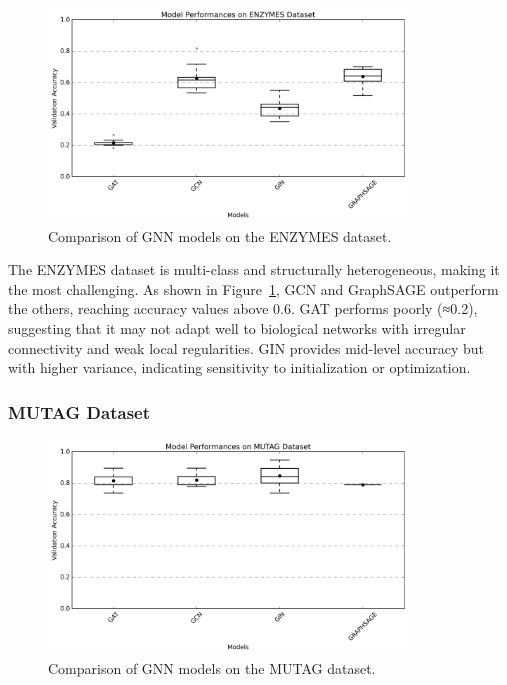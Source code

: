 \documentclass[11pt,a4paper]{article}
\begin{document}
	\begin{figure}[h]
		\centering
		\includegraphics[width=0.85\textwidth]{boxplot_ENZYMES.png}
		\caption{Comparison of GNN models on the ENZYMES dataset.}
		\label{fig:enzymes_models}
	\end{figure}
	
	The ENZYMES dataset is multi-class and structurally heterogeneous, making it the most challenging. As shown in Figure~\ref{fig:enzymes_models}, GCN and GraphSAGE outperform the others, reaching accuracy values above 0.6. GAT performs poorly (≈0.2), suggesting that it may not adapt well to biological networks with irregular connectivity and weak local regularities. GIN provides mid-level accuracy but with higher variance, indicating sensitivity to initialization or optimization.
	
	\subsubsection*{MUTAG Dataset}
	
	\begin{figure}[h]
		\centering
		\includegraphics[width=0.85\textwidth]{boxplot_MUTAG.png}
		\caption{Comparison of GNN models on the MUTAG dataset.}
		\label{fig:mutag_models}
	\end{figure}
	
\end{document}
